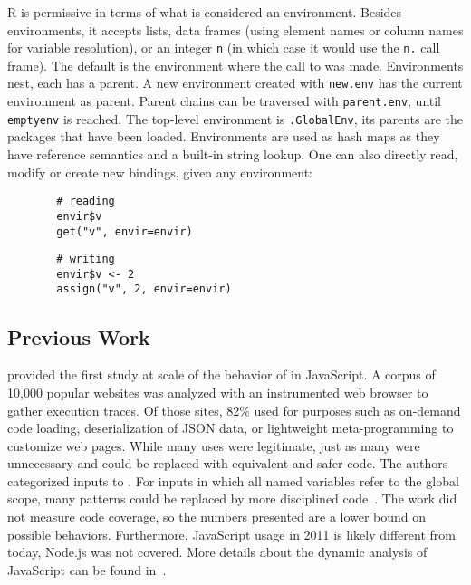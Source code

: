 \documentclass[acmsmall, screen]{acmart}
\renewcommand{\k}[1]{\lstinline |#1|\xspace}
\begin{document}
R is permissive in terms of what is considered an environment. Besides
environments, it accepts lists, data frames (using element names or column names
for variable resolution), or an integer \k{n} (in which case it would use the
\k{n.} call frame). The default is the environment where the call to \eval was
made.
%
Environments nest, each has a parent. A new environment created with \k{new.env}
has the current environment as parent. Parent chains can be traversed with
\k{parent.env}, until \k{emptyenv} is reached. The top-level environment is
\k{.GlobalEnv}, its parents are the packages that have been loaded. Environments
are used as hash maps as they have reference semantics and a built-in string
lookup. One can also directly read, modify or create new bindings, given any
environment:
%
\begin{figure}[H]
\begin{minipage}{.49\textwidth}
  \begin{lstlisting}
  # reading
  envir$v
  get("v", envir=envir)
  \end{lstlisting}
\end{minipage}
\begin{minipage}{.49\textwidth}
  \begin{lstlisting}
  # writing
  envir$v <- 2
  assign("v", 2, envir=envir)
  \end{lstlisting}
\end{minipage}
\end{figure}
%

\subsection{Previous Work}

\citet{ecoop11} provided the first study at scale of the behavior of \eval in
JavaScript. A corpus of 10,000 popular websites was analyzed with an
instrumented web browser to gather execution traces. Of those sites, 82\% used
\eval for purposes such as on-demand code loading, deserialization of JSON data,
or lightweight meta-programming to customize web pages. While many uses were
legitimate, just as many were unnecessary and could be replaced with equivalent
and safer code. The authors categorized inputs to \eval. For inputs in
which all named variables refer to the global scope, many patterns could be
replaced by more disciplined code~\cite{oopsla12b, moller12}. The work did not
measure code coverage, so the numbers presented are a lower bound on possible
behaviors. Furthermore, JavaScript usage in 2011 is likely different from today,
\eg Node.js was not covered. More details about the dynamic analysis of JavaScript
can be found in~\cite{liang}.
\end{document}
